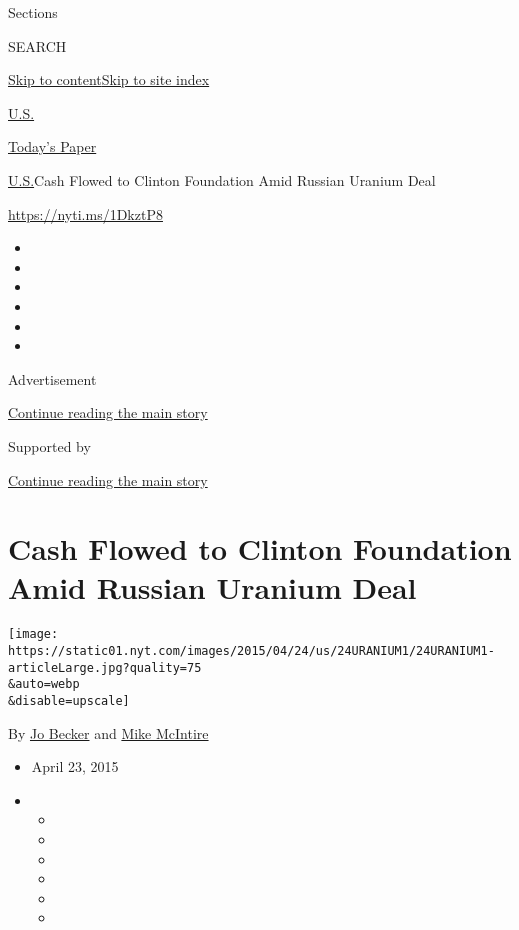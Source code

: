 Sections

SEARCH

\protect\hyperlink{site-content}{Skip to
content}\protect\hyperlink{site-index}{Skip to site index}

\href{https://www.nytimes.com/section/us}{U.S.}

\href{https://myaccount.nytimes.com/auth/login?response_type=cookie\&client_id=vi}{}

\href{https://www.nytimes.com/section/todayspaper}{Today's Paper}

\href{/section/us}{U.S.}\textbar{}Cash Flowed to Clinton Foundation Amid
Russian Uranium Deal

\url{https://nyti.ms/1DkztP8}

\begin{itemize}
\item
\item
\item
\item
\item
\item
\end{itemize}

Advertisement

\protect\hyperlink{after-top}{Continue reading the main story}

Supported by

\protect\hyperlink{after-sponsor}{Continue reading the main story}

\hypertarget{cash-flowed-to-clinton-foundation-amid-russian-uranium-deal}{%
\section{Cash Flowed to Clinton Foundation Amid Russian Uranium
Deal}\label{cash-flowed-to-clinton-foundation-amid-russian-uranium-deal}}

\texttt{[image: https://static01.nyt.com/images/2015/04/24/us/24URANIUM1/24URANIUM1-articleLarge.jpg?quality=75\\\&auto=webp\\\&disable=upscale]}

By \href{http://www.nytimes.com/by/jo-becker}{Jo Becker} and
\href{http://www.nytimes.com/by/mike-mcintire}{Mike McIntire}

\begin{itemize}
\item
  April 23, 2015
\item
  \begin{itemize}
  \item
  \item
  \item
  \item
  \item
  \item
  \end{itemize}
\end{itemize}

